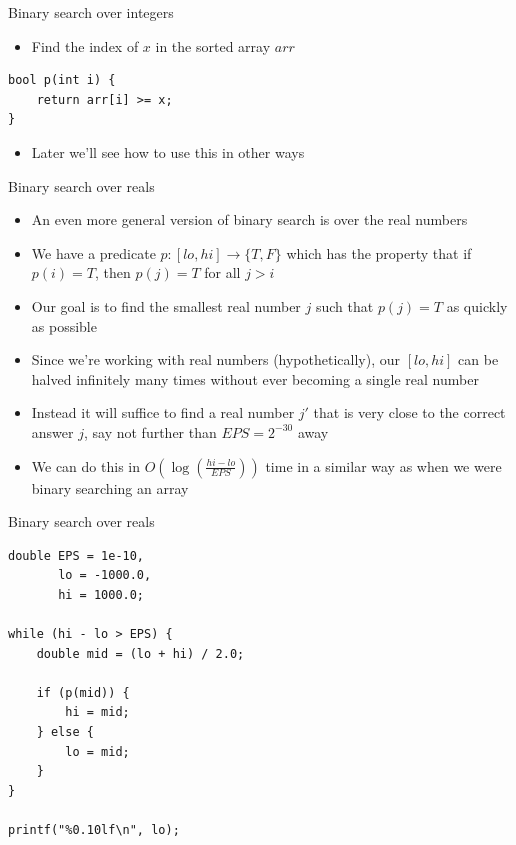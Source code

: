 \documentclass[10pt]{beamer}
\newcommand{\bi}{\begin{itemize}}
\newcommand{\ei}{\end{itemize}}
\begin{document}
\begin{frame}[fragile]{Binary search over integers}
    \bi
        \item Find the index of $x$ in the sorted array $arr$
    \ei
    \begin{verbatim}
bool p(int i) {
    return arr[i] >= x;
}
    \end{verbatim}

    \vspace{20pt}
    \bi
        \item Later we'll see how to use this in other ways
    \ei
\end{frame}

\begin{frame}[fragile]{Binary search over reals}
    \bi
        \item An even more general version of binary search is over the real numbers
        \item We have a predicate $p : [lo,hi] \rightarrow \{T, F\}$ which has the property that if $p(i) = T$, then $p(j) = T$ for all $j > i$
        \item Our goal is to find the smallest real number $j$ such that $p(j) = T$ as quickly as possible

        \vspace{5pt}
        \item Since we're working with real numbers (hypothetically), our $[lo,hi]$ can be halved infinitely many times without ever becoming a single real number
        \item Instead it will suffice to find a real number $j'$ that is very close to the correct answer $j$, say not further than $EPS = 2^{-30}$ away

        \vspace{5pt}
    \item We can do this in $O(\log(\frac{hi - lo}{EPS}))$ time in a similar way as when we were binary searching an array
    \ei
\end{frame}

\begin{frame}[fragile]{Binary search over reals}
    \begin{verbatim}
double EPS = 1e-10,
       lo = -1000.0,
       hi = 1000.0;

while (hi - lo > EPS) {
    double mid = (lo + hi) / 2.0;

    if (p(mid)) {
        hi = mid;
    } else {
        lo = mid;
    }
}

printf("%0.10lf\n", lo);
    \end{verbatim}
\end{frame}
\end{document}
